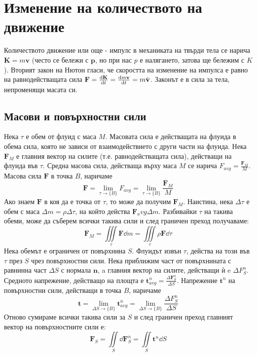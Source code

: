 \setcounter{equation}{0}
\section{Изменение на количеството на движение}
Количеството движение или още - импулс в механиката на твърди тела се нарича $\mathbf{K} = m\mathbf{v}$ (често се бележи с $\mathbf{p}$, но при нас $p$ е налягането, затова ще бележим с $K$).
Вторият закон на Нютон гласи, че скоростта на изменение на импулса е равно на равнодействащата сила $\mathbf{F} = \dv{\mathbf{K}}{t} = \dv{m\mathbf{v}}{t}= m \dot{\mathbf{v}}$.
Законът е в сила за тела, непроменящи масата си.

\subsection{Масови и повърхностни сили}
Нека $\tau$ е обем от флуид с маса $M$.
Масовата сила е действащата на флуида в обема сила, която не зависи от взаимодействието с други части на флуида.
Нека $\mathbf{F}_M$ е главния вектор на силите (т.е. равнодействащата сила), действащи на флуида във $\tau$.
Средна масова сила, действаща върху маса $M$ се нарича $F_{avg} = \frac{\mathbf{F}_M}{M}$.
Масова сила $\mathbf{F}$ в точка $B$, наричаме
\begin{equation}
  \mathbf{F} = \lim_{\tau \to \{B\}} F_{avg} = \lim_{\tau \to \{B\}} \frac{\mathbf{F}_M}{M}
\end{equation}
Ако знаем $\mathbf{F}$ в коя да е точка от $\tau$, то може да получим $\mathbf{F}_M$.
Наистина, нека $\Delta \tau$ е обем с маса $\Delta m = \rho \Delta \tau$, на който действа $\mathbf{F}_avg \Delta m$.
Разбивайки $\tau$ на такива обеми, може да съберем всички такива сили и след граничен преход получаваме:
\begin{equation}
  \mathbf{F}_M = \iiint\limits_{\tau} \mathbf{F} \dd m = \iiint\limits_{\tau} \rho \mathbf{F} \dd \tau
\end{equation}
Нека обемът е ограничен от повърхнина $S$. Флуидът извън $\tau$, действа на този във $\tau$ през $S$ чрез повърхностни сили.
Нека приближим част от повърхнината с равнинна част $\Delta S$ с нормала $\mathbf{n}$, a главния вектор на силите, действащи ѝ e $\Delta F_S^n$.
Средното напрежение, действащо на площта е $\mathbf{t}_{avg}^n = \frac{\Delta \mathbf{F}_S^n}{\Delta S}$.
Напрежение $\mathbf{t}^n$ на повърхностни сили, действащи в точка $B$, наричаме
\begin{equation}
  \mathbf{t} = \lim_{\Delta S \to \{B\}} \mathbf{t}_{avg}^n = \lim_{\Delta S \to \{B\}} \frac{\Delta F_S^n}{\Delta S}
\end{equation}
Отново сумираме всички такива сили за $S$ и след граничен преход главният вектор на повърхностните сили е:
\begin{equation}
  \mathbf{F}_S = \iint\limits_{S} \dd \mathbf{F}_S^n = \iint\limits_{S} \mathbf{t}^n \dd S
\end{equation}


